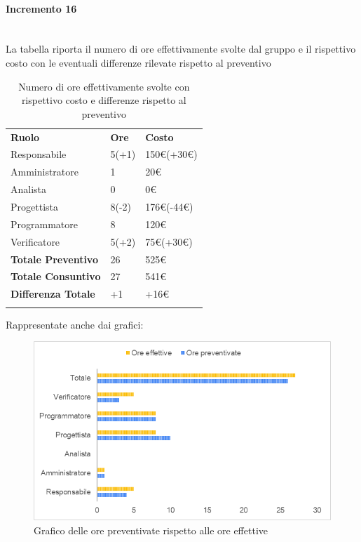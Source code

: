 \paragraph*{Incremento 16} \mbox{} \\
La tabella riporta il numero di ore effettivamente svolte dal gruppo e il rispettivo costo con le eventuali differenze rilevate rispetto al preventivo
\begin{longtable} {							
		>{}p{40mm}  
		>{}p{20mm}	
		>{}p{28mm}			
	}			
	\rowcolor{gray!50}
	
	\textbf{Ruolo}            & \textbf{Ore} & \textbf{Costo}       \TBstrut \\
	Responsabile              & 5(+1)        & 150\euro(+30\euro)   \TBstrut \\
	Amministratore            & 1            & 20\euro              \TBstrut \\
	Analista                  & 0            & 0\euro               \TBstrut \\
	Progettista               & 8(-2)        & 176\euro(-44\euro)   \TBstrut \\
	Programmatore             & 8            & 120\euro             \TBstrut \\
	Verificatore              & 5(+2)        & 75\euro(+30\euro)    \TBstrut \\
	\textbf{Totale Preventivo}& 26           & 525\euro             \TBstrut \\	
	\textbf{Totale Consuntivo}& 27           & 541\euro             \TBstrut \\	
	\textbf{Differenza Totale}& +1           & +16\euro             \TBstrut \\
	\rowcolor{white}
	\caption{Numero di ore effettivamente svolte con rispettivo costo e differenze rispetto al preventivo}	
\end{longtable}

Rappresentate anche dai grafici:
\begin{figure} [H]
	\includegraphics[width=\linewidth]{./img/Grafici/41.png}
	\caption{Grafico delle ore preventivate rispetto alle ore effettive}
\end{figure}

